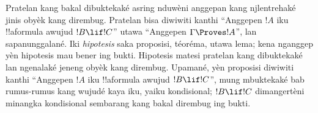 \documentclass[../../../include/open-logic-section]{subfiles}
\begin{document}
Pratelan kang bakal dibuktekaké asring nduwèni anggepan kang
njlentrehaké jinis obyèk kang dirembug. Pratelan bisa diwiwiti kanthi
``Anggepen $!A$ iku !!a{formula} awujud $!B \lif !C$'' utawa
``Anggepen $\Gamma \Proves !A$'', lan sapanunggalané. Iki
\emph{hipotesis} saka proposisi, téoréma, utawa lema;
kena nganggep yèn hipotesis mau bener ing bukti.
Hipotesis matesi pratelan kang dibuktekaké lan ngenalaké jeneng
obyèk kang dirembug. Upamané, yèn proposisi diwiwiti kanthi
``Anggepen $!A$ iku !!a{formula} awujud $!B \lif !C$'',
mung mbuktekaké bab rumus-rumus kang wujudé kaya iku,
yaiku kondisional; $!B \lif !C$ dimangertèni minangka kondisional
sembarang kang bakal dirembug ing bukti.
\end{document}
